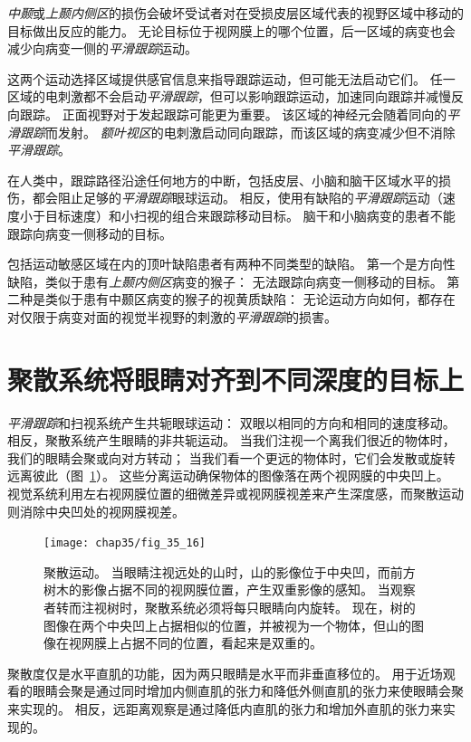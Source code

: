 \textit{中颞}或\textit{上颞内侧区}的损伤会破坏受试者对在受损皮层区域代表的视野区域中移动的目标做出反应的能力。
无论目标位于视网膜上的哪个位置，后一区域的病变也会减少向病变一侧的\textit{平滑跟踪}运动。


这两个运动选择区域提供感官信息来指导跟踪运动，但可能无法启动它们。
任一区域的电刺激都不会启动\textit{平滑跟踪}，但可以影响跟踪运动，加速同向跟踪并减慢反向跟踪。
正面视野对于发起跟踪可能更为重要。
该区域的神经元会随着同向的\textit{平滑跟踪}而发射。
\textit{额叶视区}的电刺激启动同向跟踪，而该区域的病变减少但不消除\textit{平滑跟踪}。


在人类中，跟踪路径沿途任何地方的中断，包括皮层、小脑和脑干区域水平的损伤，都会阻止足够的\textit{平滑跟踪}眼球运动。
相反，使用有缺陷的\textit{平滑跟踪}运动（速度小于目标速度）和小扫视的组合来跟踪移动目标。
脑干和小脑病变的患者不能跟踪向病变一侧移动的目标。


包括运动敏感区域在内的顶叶缺陷患者有两种不同类型的缺陷。
第一个是方向性缺陷，类似于患有\textit{上颞内侧区}病变的猴子：
无法跟踪向病变一侧移动的目标。
第二种是类似于患有中颞区病变的猴子的视黄质缺陷：
无论运动方向如何，都存在对仅限于病变对面的视觉半视野的刺激的\textit{平滑跟踪}的损害。



\section{聚散系统将眼睛对齐到不同深度的目标上}

\textit{平滑跟踪}和扫视系统产生共轭眼球运动：
双眼以相同的方向和相同的速度移动。
相反，聚散系统产生眼睛的非共轭运动。
当我们注视一个离我们很近的物体时，我们的眼睛会聚或向对方转动；
当我们看一个更远的物体时，它们会发散或旋转远离彼此（图~\ref{fig:35_16}）。
这些分离运动确保物体的图像落在两个视网膜的中央凹上。
视觉系统利用左右视网膜位置的细微差异或视网膜视差来产生深度感，而聚散运动则消除中央凹处的视网膜视差。


\begin{figure}[htbp]
	\centering
	\texttt{[image: chap35/fig\_35\_16]}
	\caption{聚散运动。
		当眼睛注视远处的山时，山的影像位于中央凹，而前方树木的影像占据不同的视网膜位置，产生双重影像的感知。
		当观察者转而注视树时，聚散系统必须将每只眼睛向内旋转。
		现在，树的图像在两个中央凹上占据相似的位置，并被视为一个物体，但山的图像在视网膜上占据不同的位置，看起来是双重的。}
	\label{fig:35_16}
\end{figure}


聚散度仅是水平直肌的功能，因为两只眼睛是水平而非垂直移位的。
用于近场观看的眼睛会聚是通过同时增加内侧直肌的张力和降低外侧直肌的张力来使眼睛会聚来实现的。
相反，远距离观察是通过降低内直肌的张力和增加外直肌的张力来实现的。


